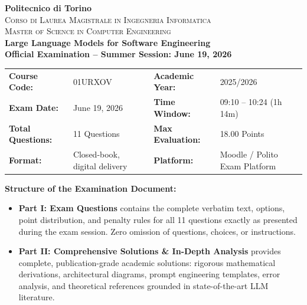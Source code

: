 \documentclass[11pt,a4paper]{article}
\begin{document}
\begin{center}
    {\LARGE\textbf{\color{primary}Politecnico di Torino}}\\[3pt]
    {\large\textsc{Corso di Laurea Magistrale in Ingegneria Informatica}}\\[2pt]
    {\large\textsc{Master of Science in Computer Engineering}}\\[8pt]
    {\Large\textbf{\color{secondary}Large Language Models for Software Engineering}}\\[4pt]
    {\textbf{Official Examination -- Summer Session: June 19, 2026}}
\end{center}

\vspace{0.2cm}

\begin{center}
\begin{tcolorbox}[enhanced,colback=boxbg!60,colframe=primary,arc=2mm,boxrule=0.8pt,width=\textwidth]
\begin{tabularx}{\textwidth}{lXlX}
\textbf{Course Code:} & 01URXOV & \textbf{Academic Year:} & 2025/2026 \\
\textbf{Exam Date:} & June 19, 2026 & \textbf{Time Window:} & 09:10 -- 10:24 (1h 14m) \\
\textbf{Total Questions:} & 11 Questions & \textbf{Max Evaluation:} & 18.00 Points \\
\textbf{Format:} & Closed-book, digital delivery & \textbf{Platform:} & Moodle / Polito Exam Platform \\
\end{tabularx}
\end{tcolorbox}
\end{center}

\vspace{0.1cm}

\noindent\textbf{Structure of the Examination Document:}
\begin{itemize}[noitemsep,topsep=2pt]
    \item \textbf{Part I: Exam Questions} contains the complete verbatim text, options, point distribution, and penalty rules for all 11 questions exactly as presented during the exam session. Zero omission of questions, choices, or instructions.
    \item \textbf{Part II: Comprehensive Solutions \& In-Depth Analysis} provides complete, publication-grade academic solutions: rigorous mathematical derivations, architectural diagrams, prompt engineering templates, error analysis, and theoretical references grounded in state-of-the-art LLM literature.
\end{itemize}
\end{document}
